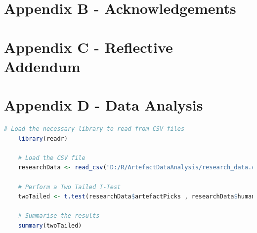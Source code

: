 \section*{Appendix B - Acknowledgements} \label{append:b}

\section*{Appendix C - Reflective Addendum} \label{append:C}

\newpage
\section*{Appendix D - Data Analysis} \label{append:d}
\begin{lstlisting}[language=R, caption = Example R code for a Two Tailed T-Test using data from an imported CSV file, captionpos =b]
    # Load the necessary library to read from CSV files
    library(readr)

    # Load the CSV file
    researchData <- read_csv("D:/R/ArtefactDataAnalysis/research_data.csv")

    # Perform a Two Tailed T-Test
    twoTailed <- t.test(researchData$artefactPicks , researchData$humanPicks)

    # Summarise the results
    summary(twoTailed)
\end{lstlisting}


\newpage
